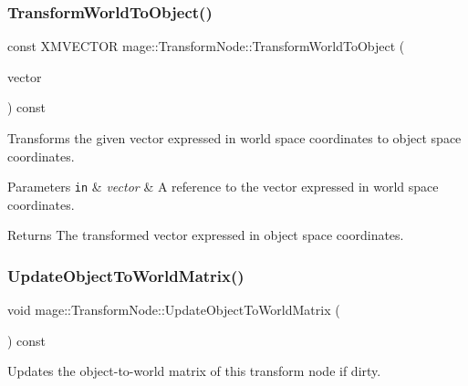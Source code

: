 \subsubsection{\texorpdfstring{Transform\+World\+To\+Object()}{TransformWorldToObject()}}
{\footnotesize\ttfamily const X\+M\+V\+E\+C\+T\+OR mage\+::\+Transform\+Node\+::\+Transform\+World\+To\+Object (\begin{DoxyParamCaption}\item[{const X\+M\+V\+E\+C\+T\+OR \&}]{vector }\end{DoxyParamCaption}) const}

Transforms the given vector expressed in world space coordinates to object space coordinates.


\begin{DoxyParams}[1]{Parameters}
\mbox{\tt in}  & {\em vector} & A reference to the vector expressed in world space coordinates. \\
\hline
\end{DoxyParams}
\begin{DoxyReturn}{Returns}
The transformed vector expressed in object space coordinates. 
\end{DoxyReturn}
\hypertarget{classmage_1_1_transform_node_ac607aac55f3134bf57299d5874c9e9eb}{}\label{classmage_1_1_transform_node_ac607aac55f3134bf57299d5874c9e9eb} 
\subsubsection{\texorpdfstring{Update\+Object\+To\+World\+Matrix()}{UpdateObjectToWorldMatrix()}}
{\footnotesize\ttfamily void mage\+::\+Transform\+Node\+::\+Update\+Object\+To\+World\+Matrix (\begin{DoxyParamCaption}{ }\end{DoxyParamCaption}) const\hspace{0.3cm}{\ttfamily [private]}}

Updates the object-\/to-\/world matrix of this transform node if dirty. \hypertarget{classmage_1_1_transform_node_afe8b6b5e882611e1b95bcc61b0db7b5c}{}\label{classmage_1_1_transform_node_afe8b6b5e882611e1b95bcc61b0db7b5c} 
